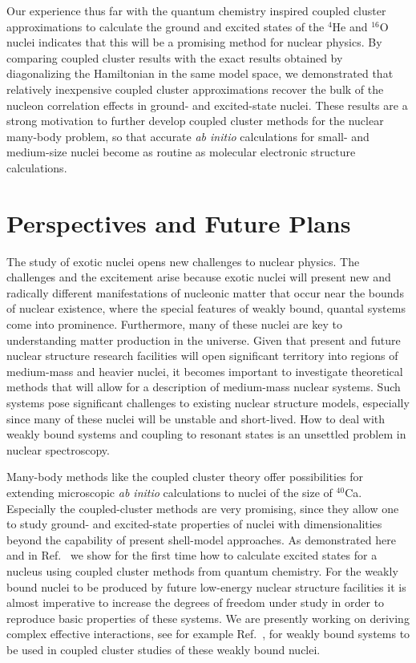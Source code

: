\documentclass{ws-procs9x6}
\begin{document}
Our experience thus far with the 
quantum chemistry inspired coupled cluster
approximations to calculate the ground and excited states of the
$^{4}$He and $^{16}$O nuclei indicates that this will be a promising
method for nuclear physics.  By comparing coupled cluster results
with the exact results obtained by diagonalizing the Hamiltonian in
the same model space, we demonstrated that relatively inexpensive
coupled cluster approximations recover the bulk of the nucleon
correlation effects in ground- and excited-state nuclei. These results
are a strong motivation to further develop coupled cluster methods for
the nuclear many-body problem, so that accurate {\it ab initio}
calculations for small- and medium-size nuclei become as routine as
molecular electronic structure calculations.


\section{Perspectives and Future Plans}
The study of exotic nuclei opens new 
challenges to nuclear physics. 
The challenges and the excitement arise 
because exotic nuclei will present new and 
radically different manifestations of nucleonic matter 
that occur near the bounds of nuclear existence, 
where the special features of weakly bound, quantal systems 
come into prominence. Furthermore, many of these
nuclei are key to understanding matter production in the universe.
Given that present and future nuclear structure research facilities
will open significant
territory into regions of medium-mass and heavier nuclei,
it becomes important to investigate theoretical methods that will allow
for a description of medium-mass nuclear systems. 
Such systems pose significant
challenges to existing nuclear structure models, especially since many of
these nuclei will be unstable and short-lived. How to deal with weakly
bound systems and coupling to resonant states is an unsettled problem in
nuclear spectroscopy. 

Many-body methods like the 
coupled cluster theory offer possibilities for extending
microscopic {\it ab initio} calculations to nuclei of the size of $^{40}$Ca.
Especially the coupled-cluster methods are
very promising, since they allow one to study 
ground- and excited-state properties of nuclei
with dimensionalities beyond the capability of present shell-model
approaches. As demonstrated here and in Ref.~\cite{ref2} we 
show for the first time how to calculate 
excited states for a nucleus using coupled cluster 
methods from quantum chemistry.
For the weakly bound nuclei to be produced by future low-energy 
nuclear structure facilities
it is almost imperative to increase the
degrees of freedom under study in order to reproduce
basic properties of these systems. 
We are presently working on deriving complex 
effective interactions, see for example
Ref.~\cite{hvh2004}, 
for weakly bound systems to be used in coupled cluster 
studies of these weakly bound nuclei. 
\end{document}
